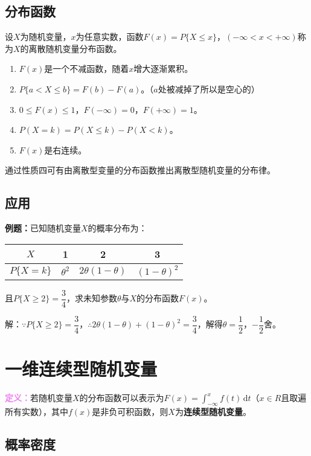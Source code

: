 \subsection{分布函数}

设$X$为随机变量，$x$为任意实数，函数$F(x)=P\{X\leqslant x\}$，$(-\infty<x<+\infty)$称为$X$的离散随机变量分布函数。

\begin{enumerate}
    \item $F(x)$是一个不减函数，随着$x$增大逐渐累积。
    \item $P\{a<X\leqslant b\}=F(b)-F(a)$。（$a$处被减掉了所以是空心的）
    \item $0\leqslant F(x)\leqslant1$，$F(-\infty)=0$，$F(+\infty)=1$。
    \item $P(X=k)=P(X\leqslant k)-P(X<k)$。
    \item $F(x)$是右连续。
\end{enumerate}

通过性质四可有由离散型变量的分布函数推出离散型随机变量的分布律。

\subsection{应用}

\textbf{例题：}已知随机变量$X$的概率分布为：\medskip

\begin{tabular}{c|ccc}
    \hline
    $X$ & 1 & 2 & 3 \\ \hline
    $P\{X=k\}$ & $\theta^2$ & $2\theta(1-\theta)$ & $(1-\theta)^2$ \\
    \hline
\end{tabular} \medskip

且$P\{X\geqslant2\}=\dfrac{3}{4}$，求未知参数$\theta$与$X$的分布函数$F(x)$。

解：$\because P\{X\geqslant2\}=\dfrac{3}{4}$，$\therefore 2\theta(1-\theta)+(1-\theta)^2=\dfrac{3}{4}$，解得$\theta=\dfrac{1}{2}$，$-\dfrac{1}{2}$舍。

\section{一维连续型随机变量}

\textcolor{violet}{\textbf{定义：}}若随机变量$X$的分布函数可以表示为$F(x)=\int_{-\infty}^xf(t)\,\textrm{d}t$（$x\in R$且取遍所有实数），其中$f(x)$是非负可积函数，则$X$为\textbf{连续型随机变量}。

\subsection{概率密度}

